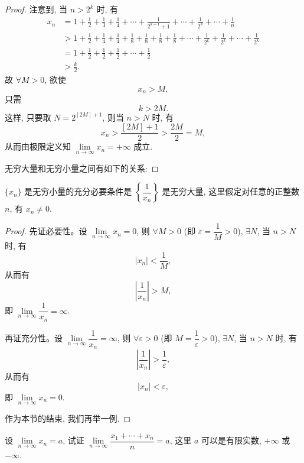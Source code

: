 \begin{proof}
注意到, 当 $n>2^k$ 时, 有
\[
\begin{aligned}
  x_n
  &=1+\frac12+\frac13+\frac14+\cdots+\frac1{2^{k-1}+1}
    +\cdots+\frac1{2^k}+\cdots+\frac1n\\
  &>1+\frac12+\frac14+\frac14+\frac18+\frac18+\frac18+\frac18
    +\cdots+\frac1{2^k}+\frac1{2^k}+\cdots+\frac1{2^k}\\
  &=1+\frac12+\frac12+\frac12+\cdots+\frac12\\
  &>\frac k2.
\end{aligned}
\]
故 $\forall M>0$, 欲使
\[
  x_n>M,
\]
只需
\[
  k>2M.
\]
这样, 只要取 $N=2^{[2M]+1}$, 则当 $n>N$ 时, 有
\[
  x_n>\frac{[2M]+1}{2}>\frac{2M}{2}=M,
\]
从而由极限定义知 $\lim\limits_{n\to\infty}x_n=+\infty$ 成立.

无穷大量和无穷小量之间有如下的关系:
\end{proof}


\begin{theorem}\label{theorem:ma-2-1-2}
$\{x_n\}$ 是无穷小量的充分必要条件是 $\left\{\dfrac1{x_n}\right\}$ 是无穷大量, 这里假定对任意的正整数 $n$, 有 $x_n\ne0$.
\end{theorem}


\begin{proof}
先证必要性。设 $\lim\limits_{n\to\infty}x_n=0$, 则 $\forall M>0$ (即 $\varepsilon=\dfrac1M>0$), $\exists N$, 当 $n>N$ 时, 有
\[
  |x_n|<\frac1M,
\]
从而有
\[
  \left|\frac1{x_n}\right|>M,
\]
即 $\lim\limits_{n\to\infty}\dfrac1{x_n}=\infty$.

再证充分性。设 $\lim\limits_{n\to\infty}\dfrac1{x_n}=\infty$, 则 $\forall\varepsilon>0$ (即 $M=\dfrac1\varepsilon>0$), $\exists N$, 当 $n>N$ 时, 有
\[
  \left|\frac1{x_n}\right|>\frac1\varepsilon,
\]
从而有
\[
  |x_n|<\varepsilon,
\]
即 $\lim\limits_{n\to\infty}x_n=0$.

作为本节的结束, 我们再举一例.
\end{proof}


\begin{example}\label{example:ma-2-1-13}
设 $\lim\limits_{n\to\infty}x_n=a$, 试证 $\lim\limits_{n\to\infty}\dfrac{x_1+\cdots+x_n}{n}=a$, 这里 $a$ 可以是有限实数, $+\infty$ 或 $-\infty$.
\end{example}


